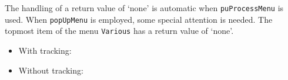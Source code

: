 \documentclass{article}
\def\cs#1{\texttt{\eqbs#1}}
\begin{document}
The handling of a return value of `none' is automatic when \cs{puProcessMenu} is used. When
\cs{popUpMenu} is employed, some special attention is needed. The topmost item of the
menu \texttt{Various} has a return value of `none'.
\begin{itemize}
   \item With tracking: 
   \item Without tracking: 
\end{itemize}
\end{document}

